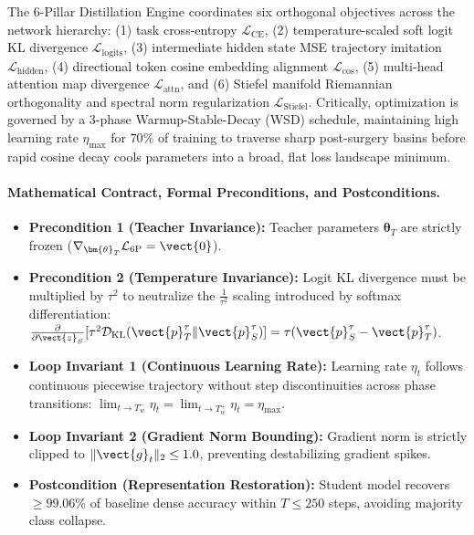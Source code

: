 The \neuralops{} 6-Pillar Distillation Engine coordinates six orthogonal objectives across the network hierarchy: (1) task cross-entropy $\mathcal{L}_{\text{CE}}$, (2) temperature-scaled soft logit KL divergence $\mathcal{L}_{\text{logits}}$, (3) intermediate hidden state MSE trajectory imitation $\mathcal{L}_{\text{hidden}}$, (4) directional token cosine embedding alignment $\mathcal{L}_{\text{cos}}$, (5) multi-head attention map divergence $\mathcal{L}_{\text{attn}}$, and (6) Stiefel manifold Riemannian orthogonality and spectral norm regularization $\mathcal{L}_{\text{Stiefel}}$. Critically, optimization is governed by a 3-phase Warmup-Stable-Decay (WSD) schedule, maintaining high learning rate $\eta_{\max}$ for $70\%$ of training to traverse sharp post-surgery basins before rapid cosine decay cools parameters into a broad, flat loss landscape minimum.

\paragraph{Mathematical Contract, Formal Preconditions, and Postconditions.}
\begin{itemize}
    \item \textbf{Precondition 1 (Teacher Invariance):} Teacher parameters $\bm{\theta}_T$ are strictly frozen ($\nabla_{\bm{\theta}_T} \mathcal{L}_{\text{6P}} = \vect{0}$).
    \item \textbf{Precondition 2 (Temperature Invariance):} Logit KL divergence must be multiplied by $\tau^2$ to neutralize the $\frac{1}{\tau^2}$ scaling introduced by softmax differentiation: $\frac{\partial}{\partial \vect{z}_S} [\tau^2 \mathcal{D}_{\text{KL}}(\vect{p}_T^\tau \| \vect{p}_S^\tau)] = \tau (\vect{p}_S^\tau - \vect{p}_T^\tau)$.
    \item \textbf{Loop Invariant 1 (Continuous Learning Rate):} Learning rate $\eta_t$ follows continuous piecewise trajectory without step discontinuities across phase transitions: $\lim_{t \to T_w^-} \eta_t = \lim_{t \to T_w^+} \eta_t = \eta_{\max}$.
    \item \textbf{Loop Invariant 2 (Gradient Norm Bounding):} Gradient norm is strictly clipped to $\|\vect{g}_t\|_2 \le 1.0$, preventing destabilizing gradient spikes.
    \item \textbf{Postcondition (Representation Restoration):} Student model recovers $\ge 99.06\%$ of baseline dense accuracy within $T \le 250$ steps, avoiding majority class collapse.
\end{itemize}

